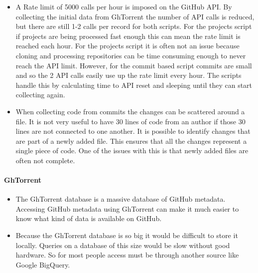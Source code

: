 \documentclass{article}
\begin{document}
\begin{itemize}
    \item A Rate limit of 5000 calls per hour is imposed on the GitHub API. By collecting the initial data from GhTorrent the number of API calls is reduced, but there are still 1-2 calls per record for both scripts. For the projects script if projects are being processed fast enough this can mean the rate limit is reached each hour. For the projects script it is often not an issue because cloning and processing repositories can be time consuming enough to never reach the API limit. However, for the commit based script commits are small and so the 2 API calls easily use up the rate limit every hour. The scripts handle this by calculating time to API reset and sleeping until they can start collecting again.

    \item When collecting code from commits the changes can be scattered around a file. It is not very useful to have 30 lines of code from an author if those 30 lines are not connected to one another. It is possible to identify changes that are part of a newly added file. This ensures that all the changes represent a single piece of code. One of the issues with this is that newly added files are often not complete.
\end{itemize}

\paragraph{GhTorrent}
\begin{itemize}
    \item The GhTorrent database is a massive database of GitHub metadata. Accessing GitHub metadata using GhTorrent can make it much easier to know what kind of data is available on GitHub.
    
    \item Because the GhTorrent database is so big it would be difficult to store it locally. Queries on a database of this size would be slow without good hardware. So for most people access must be through another source like Google BigQuery. 
\end{itemize}
\end{document}
